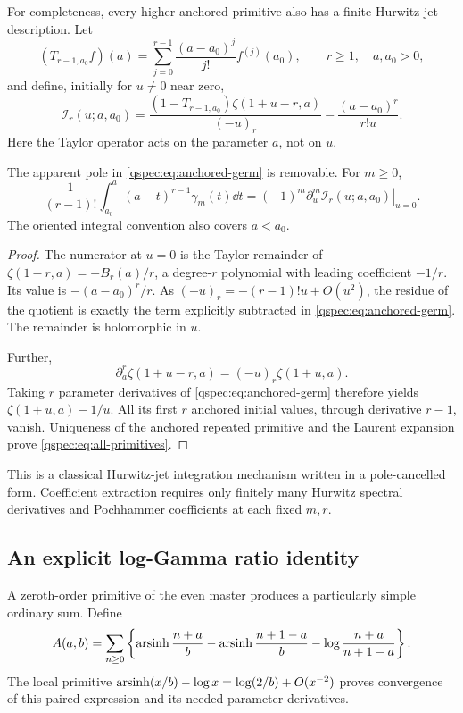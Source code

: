 For completeness, every higher anchored primitive also has a finite
Hurwitz-jet description. Let
\[
(T_{r-1,a_0}f)(a)=\sum_{j=0}^{r-1}\frac{(a-a_0)^j}{j!}f^{(j)}(a_0),
\qquad r\ge1,\quad a,a_0>0,
\]
and define, initially for $u\ne0$ near zero,
\begin{equation}\label{qspec:eq:anchored-germ}
\mathcal I_r(u;a,a_0)=
\frac{(1-T_{r-1,a_0})\zeta(1+u-r,a)}{(-u)_r}
-\frac{(a-a_0)^r}{r!u}.
\end{equation}
Here the Taylor operator acts on the parameter $a$, not on $u$.

\begin{proposition}
\label{qspec:prop:all-primitives}
The apparent pole in \eqref{qspec:eq:anchored-germ} is removable. For
$m\ge0$,
\begin{equation}\label{qspec:eq:all-primitives}
\frac1{(r-1)!}\int_{a_0}^a(a-t)^{r-1}\gamma_m(t)\dd t
=(-1)^m\left.\partial_u^m\mathcal I_r(u;a,a_0)\right|_{u=0}.
\end{equation}
The oriented integral convention also covers $a<a_0$.
\end{proposition}
\begin{proof}
The numerator at $u=0$ is the Taylor remainder of
$\zeta(1-r,a)=-B_r(a)/r$, a degree-$r$ polynomial with leading
coefficient $-1/r$. Its value is $-(a-a_0)^r/r$.
As $(-u)_r=-(r-1)!u+O(u^2)$, the residue of the quotient is exactly
the term explicitly subtracted in \eqref{qspec:eq:anchored-germ}.
The remainder is holomorphic in $u$.

Further,
\[
\partial_a^r\zeta(1+u-r,a)=(-u)_r\zeta(1+u,a).
\]
Taking $r$ parameter derivatives of \eqref{qspec:eq:anchored-germ}
therefore yields $\zeta(1+u,a)-1/u$. All its first $r$ anchored
initial values, through derivative $r-1$, vanish. Uniqueness of the
anchored repeated primitive and the Laurent expansion prove
\eqref{qspec:eq:all-primitives}.
\end{proof}
This is a classical Hurwitz-jet integration mechanism written in a
pole-cancelled form. Coefficient extraction requires only finitely many
Hurwitz spectral derivatives and Pochhammer coefficients at each fixed
$m,r$.

\subsection{An explicit log-Gamma ratio identity}
A zeroth-order primitive of the even master produces a particularly
simple ordinary sum. Define
\begin{equation}\label{qspec:eq:A}
A(a,b)=\sum_{n\ge0}\left\{
\operatorname{arsinh}\frac{n+a}{b}-\operatorname{arsinh}\frac{n+1-a}{b}
-\log\frac{n+a}{n+1-a}\right\}.
\end{equation}
The local primitive
$\operatorname{arsinh}(x/b)-\log x=\log(2/b)+O(x^{-2})$ proves convergence of this
paired expression and its needed parameter derivatives.

